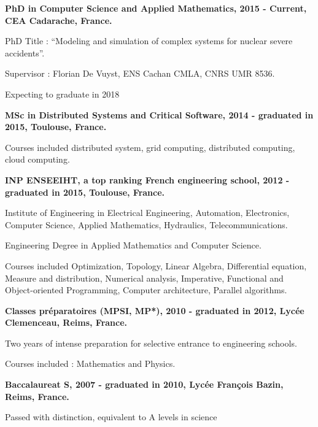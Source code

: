 \documentclass{article}
\renewenvironment{itemize}{
  \begin{list}{}{
      \setlength{\leftmargin}{1.5em}
      \setlength{\itemsep}{0.25em}
      \setlength{\parskip}{0pt}
      \setlength{\parsep}{0.25em}
    }
}{
  \end{list}
}
\begin{document}
\begin{itemize}
  	\item \textbf{PhD in Computer Science and Applied Mathematics, 2015 - Current, CEA Cadarache, France.}
		\begin{itemize}
			\item PhD Title : ``Modeling and simulation of complex systems for nuclear severe accidents''.
			\item Supervisor : Florian De Vuyst, ENS Cachan CMLA, CNRS UMR 8536.
			\item Expecting to graduate in 2018
		\end{itemize}
	\item \textbf{MSc in Distributed Systems and Critical Software, 2014 - graduated in 2015, Toulouse, France.}
		\begin{itemize}
			\item Courses included distributed system, grid computing, distributed computing, cloud computing.
		\end{itemize}
    \item \textbf{INP ENSEEIHT, a top ranking French engineering school, 2012 - graduated in 2015, Toulouse, France.}
		\begin{itemize}
			\item Institute of Engineering in Electrical Engineering, Automation, Electronics, Computer Science, Applied Mathematics, Hydraulics, Telecommunications.
			\item Engineering Degree in Applied Mathematics and Computer Science.
			\item Courses included Optimization, Topology, Linear Algebra, Differential equation, Measure and distribution, Numerical analysis, Imperative, Functional and Object-oriented Programming, Computer architecture, Parallel algorithms.
		\end{itemize}
	\item \textbf{Classes préparatoires (MPSI, MP*), 2010 - graduated in 2012, Lycée Clemenceau, Reims, France.}
		\begin{itemize}
			\item Two years of intense preparation for selective entrance to engineering schools.
			\item Courses included : Mathematics and Physics.
		\end{itemize}
	\item \textbf{Baccalaureat S, 2007 - graduated in 2010, Lycée François Bazin, Reims, France.}
		\begin{itemize}
			\item Passed with distinction, equivalent to A levels in science
		\end{itemize}
\end{itemize}
\end{document}
